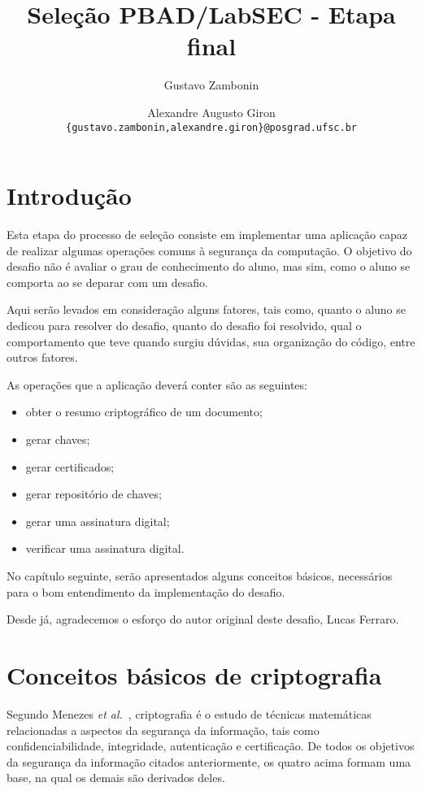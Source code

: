 \documentclass{article}
\title{Seleção PBAD/LabSEC - Etapa final}
\author{
    Gustavo Zambonin \and Alexandre Augusto Giron \\
    \texttt{\{gustavo.zambonin,alexandre.giron\}@posgrad.ufsc.br}
}
\date{}
\begin{document}
\maketitle

\section{Introdução}\label{sec:intro}

Esta etapa do processo de seleção consiste em implementar uma aplicação capaz
de realizar algumas operações comuns à segurança da computação. O objetivo do
desafio não é avaliar o grau de conhecimento do aluno, mas sim, como o aluno se
comporta ao se deparar com um desafio.

Aqui serão levados em consideração alguns fatores, tais como, quanto o aluno se
dedicou para resolver do desafio, quanto do desafio foi resolvido, qual o
comportamento que teve quando surgiu dúvidas, sua organização do código, entre
outros fatores.

As operações que a aplicação deverá conter são as seguintes:

\begin{itemize}
  \item obter o resumo criptográfico de um documento;
  \item gerar chaves;
  \item gerar certificados;
  \item gerar repositório de chaves;
  \item gerar uma assinatura digital;
  \item verificar uma assinatura digital.
\end{itemize}

No capítulo seguinte, serão apresentados alguns conceitos básicos, necessários
para o bom entendimento da implementação do desafio.

Desde já, agradecemos o esforço do autor original deste desafio, Lucas Ferraro.

\section{Conceitos básicos de criptografia}\label{sec:basiccrypto}

Segundo Menezes \textit{et al.}~\cite{Menezes:book:1996}, criptografia é o
estudo de técnicas matemáticas relacionadas a aspectos da segurança da
informação, tais como confidenciabilidade, integridade, autenticação e
certificação. De todos os objetivos da segurança da informação citados
anteriormente, os quatro acima formam uma base, na qual os demais são derivados
deles.
\end{document}
